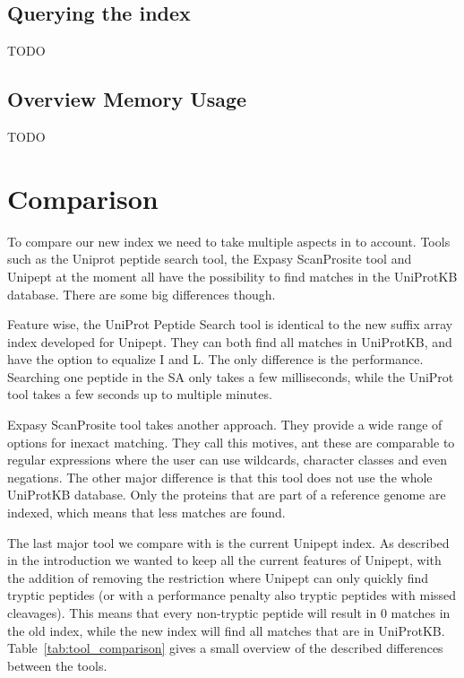 \documentclass[11pt]{article}
\begin{document}
\begin{multicols}{2}
        \subsection{Querying the index}
        TODO

        \subsection{Overview Memory Usage}
        TODO


        \section{Comparison}\label{sec:comparison}
        To compare our new index we need to take multiple aspects in to account.
        Tools such as the Uniprot peptide search tool, the Expasy ScanProsite tool and Unipept at the moment all have the possibility to find matches in the UniProtKB database.
        There are some big differences though.

        Feature wise, the UniProt Peptide Search tool is identical to the new suffix array index developed for Unipept.
        They can both find all matches in UniProtKB, and have the option to equalize I and L\@.
        The only difference is the performance.
        Searching one peptide in the SA only takes a few milliseconds, while the UniProt tool takes a few seconds up to multiple minutes.

        Expasy ScanProsite tool takes another approach.
        They provide a wide range of options for inexact matching.
        They call this motives, ant these are comparable to regular expressions where the user can use wildcards, character classes and even negations.
        The other major difference is that this tool does not use the whole UniProtKB database.
        Only the proteins that are part of a reference genome are indexed, which means that less matches are found.

        The last major tool we compare with is the current Unipept index.
        As described in the introduction we wanted to keep all the current features of Unipept, with the addition of removing the restriction where Unipept can only quickly find tryptic peptides (or with a performance penalty also tryptic peptides with missed cleavages).
        This means that every non-tryptic peptide will result in 0 matches in the old index, while the new index will find all matches that are in UniProtKB\@.
        Table~\ref{tab:tool_comparison} gives a small overview of the described differences between the tools.


\end{multicols}
\end{document}
